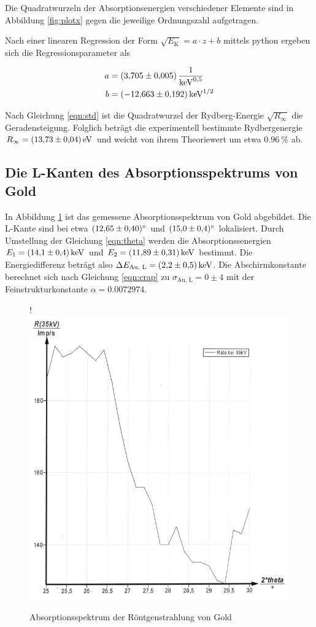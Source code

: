 Die Quadratwurzeln der Absorptionsenergien verschiedener Elemente
sind in Abbildung \ref{fig:plotx} gegen die jeweilige Ordnungszahl aufgetragen.

Nach einer linearen Regression der Form $\sqrt{E_\text{K}} = a \cdot z + b$ 
mittels python ergeben sich die Regressionsparameter als

\begin{align*}
  a &= \SI{3.705 +- 0.005}{\per \kilo \eV \tothe{1/2}} \\
  b &= \SI{-12.663 +- 0.192}{\kilo \eV \tothe{1/2}}
\end{align*}

Nach Gleichung \eqref{eqn:std} ist die Quadratwurzel der Rydberg-Energie
$\sqrt{R_\infty}$ die Geradensteigung. Folglich beträgt die experimentell
bestimmte Rydbergenergie $R_\infty = \SI{13.73 +- 0.04}{\eV}$ und weicht von ihrem
Theoriewert um etwa $\SI{0.96}{\percent}$ ab.

\subsection{Die L-Kanten des Absorptionsspektrums von Gold}

In Abbildung \ref{fig:plot7} ist das gemessene Absorptionsspektrum von Gold abgebildet.
Die L-Kante sind bei etwa $\SI{12.65 +- 0.4}{\degree}$ und $\SI{15.0 +- 0.4}{\degree}$ lokalisiert.
Durch Umstellung der Gleichung \eqref{eqn:theta} werden die Absorptionssenergien 
$ E_1 = \SI{14.1 +- 0.4}{\kilo\eV}$ und $ E_2 = \SI{11.89 +- 0.31}{\kilo\eV}$ bestimmt.
Die Energiedifferenz beträgt also $\Delta E_\text{Au, L} = \SI{2.2 +- 0.5}{\kilo\eV}$.
Die Abschirmkonstante berechnet sich nach Gleichung \eqref{eqn:crap} zu 
$\sigma_\text{Au, L} = 0 \pm 4$ mit der Feinstrukturkonstante
$\alpha = 0.0072974$.

\begin{figure}[H]!
  \centering
  \includegraphics[scale=0.3]{content/bild3.png}
  \caption{Absorptionsspektrum der Röntgenstrahlung von Gold}
  \label{fig:plot7}
\end{figure}







